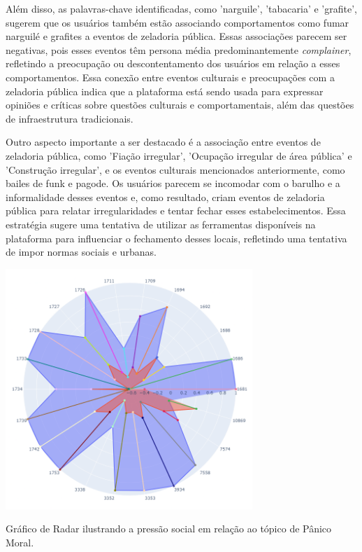 Além disso, as palavras-chave identificadas, como 'narguile', 'tabacaria' e 'grafite', sugerem que os usuários também estão associando comportamentos como fumar narguilé e grafites a eventos de zeladoria pública. Essas associações parecem ser negativas, pois esses eventos têm persona média predominantemente \textit{complainer}, refletindo a preocupação ou descontentamento dos usuários em relação a esses comportamentos. Essa conexão entre eventos culturais e preocupações com a zeladoria pública indica que a plataforma está sendo usada para expressar opiniões e críticas sobre questões culturais e comportamentais, além das questões de infraestrutura tradicionais.

Outro aspecto importante a ser destacado é a associação entre eventos de zeladoria pública, como 'Fiação irregular', 'Ocupação irregular de área pública' e 'Construção irregular', e os eventos culturais mencionados anteriormente, como bailes de funk e pagode. Os usuários parecem se incomodar com o barulho e a informalidade desses eventos e, como resultado, criam eventos de zeladoria pública para relatar irregularidades e tentar fechar esses estabelecimentos. Essa estratégia sugere uma tentativa de utilizar as ferramentas disponíveis na plataforma para influenciar o fechamento desses locais, refletindo uma tentativa de impor normas sociais e urbanas.

\begin{quadro}[htb]
	\centering
	\includegraphics[width=0.7\textwidth]{images/social_barometer_moral.png}
	\caption{Gráfico de Radar ilustrando a pressão social em relação ao tópico de Pânico Moral.}
	\label{fig:social_barometer_moral}
\end{quadro}

